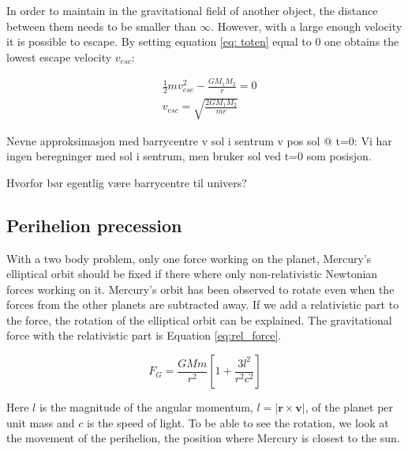 In order to maintain in the gravitational field of another object, the distance between them needs to be smaller than $ \infty $. However, with a large enough velocity it is possible to escape. By setting  equation \ref{eq: toten} equal to $ 0 $ one obtains the lowest escape velocity $ v_{esc} $: 


\begin{align}
&\frac{1}{2}mv_{esc}^2 - \frac{G	M_1M_2}{r}  = 0\\
& v_{esc} = \sqrt{ \frac{2G	M_1M_2}{mr}}
\end{align}








Nevne approksimasjon med barrycentre v sol i sentrum v pos sol @ t=0:
Vi har ingen beregninger med sol i sentrum, men bruker sol ved t=0 som posisjon. 

Hvorfor bør egentlig være barrycentre til univers?

\subsection{Perihelion precession}

With a two body problem, only one force working on the planet, Mercury's elliptical orbit should be fixed if there where only non-relativistic Newtonian forces working on it. Mercury's orbit has been observed to rotate even when the forces from the other planets are subtracted away. If we add a relativistic part to the force, the rotation of the elliptical orbit can be explained. The gravitational force with the relativistic part is Equation \ref{eq:rel_force}.

\begin{equation}\label{eq:rel_force}
F_G = \frac{GMm}{r^2}\left[ 1 + \frac{3l^2}{r^2c^2}\right]
\end{equation}
	
Here $l$ is the magnitude of the angular momentum, $l = |\textbf{r}\times \textbf{v}|$, of the planet per unit mass and $c$ is the speed of light. To be able to see the rotation, we look at the movement of the perihelion, the position where Mercury is closest to the sun.


